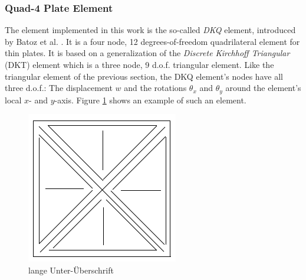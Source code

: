   \subsubsection{Quad-4 Plate Element}
  The element implemented in this work is the so-called \textit{DKQ} element, introduced by Batoz et al. \cite{batoz1982evaluation}. It is a four node, 12 degrees-of-freedom quadrilateral element for thin plates. It is based on a generalization of the \textit{Discrete Kirchhoff Triangular} (DKT) element which is a three node, 9 d.o.f. triangular element. Like the triangular element of the previous section, the DKQ element's nodes have all three d.o.f.: The displacement $w$ and the rotations $\theta_x$ and $\theta_y$ around the element's local $x$- and $y$-axis. Figure \ref{fig:platzhalter} shows an example of such an element.
  \begin{figure} %
  	\centering
  	\includegraphics[width=0.7\linewidth]{figures/platzhalter}
  	\caption[kurze Unter-Überschrift]{lange Unter-Überschrift}
  	\label{fig:platzhalter}
  \end{figure}

